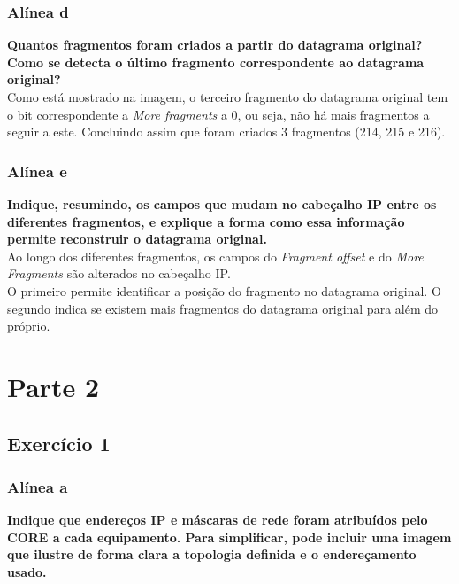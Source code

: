 \documentclass[a4paper]{report}
\begin{document}
\subsection{Alínea d}
\textbf{Quantos fragmentos foram criados a partir do datagrama original?
Como se detecta o último fragmento correspondente ao datagrama original?}\\
Como está mostrado na imagem, o terceiro fragmento do datagrama original
tem o bit correspondente a \textit{More fragments} a 0, ou seja, não há mais 
fragmentos a seguir a este. Concluindo assim que foram criados 3 fragmentos 
(214, 215 e 216).

\subsection{Alínea e}
\textbf{Indique, resumindo, os campos que mudam no cabeçalho IP entre os
diferentes fragmentos, e explique a forma como essa informação permite
reconstruir o datagrama original.}\\
Ao longo dos diferentes fragmentos, os campos do \textit{Fragment offset} e do
\textit{More Fragments} são alterados no cabeçalho IP.\\
O primeiro permite identificar a posição do fragmento no datagrama original. O
segundo indica se existem mais fragmentos do datagrama original para além do
próprio.


\chapter{Parte 2}

\section{Exercício 1}

\subsection{Alínea a}
\textbf{Indique que endereços IP e máscaras de rede foram atribuídos pelo CORE a
cada equipamento. Para simplificar, pode incluir uma imagem que ilustre de forma
clara a topologia definida e o endereçamento usado.}
\end{document}
